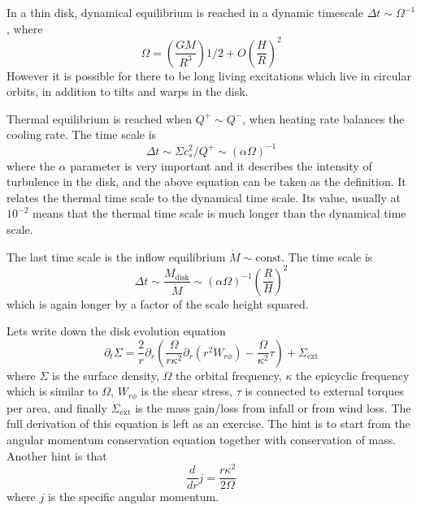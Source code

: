 \documentclass[letterpaper, 11pt]{article}
\numberwithin{equation}{section}
\numberwithin{figure}{section}
\begin{document}
In a thin disk, dynamical equilibrium is reached in a dynamic timescale $\Delta
t \sim \Omega^{-1}$, where
\begin{equation}
  \label{eq:5}
  \Omega = \left( \frac{GM}{R^3} \right)1/2 + O \left( \frac{H}{R} \right)^2
\end{equation}
However it is possible for there to be long living excitations which live in
circular orbits, in addition to tilts and warps in the disk.

Thermal equilibrium is reached when $Q^+ \sim Q^{-}$, when heating rate balances
the cooling rate. The time scale is
\begin{equation}
  \label{eq:6}
  \Delta t \sim \Sigma c_s^2 / Q^+ \sim (\alpha\Omega)^{-1}
\end{equation}
where the $\alpha$ parameter is very important and it describes the intensity of
turbulence in the disk, and the above equation can be taken as the definition.
It relates the thermal time scale to the dynamical time scale. Its value,
usually at $10^{-2}$ means that the thermal time scale is much longer than the
dynamical time scale.

The last time scale is the inflow equilibrium $\dot{M} \sim \mathrm{const}$. The
time scale is
\begin{equation}
  \label{eq:7}
  \Delta t \sim \frac{M_\mathrm{disk}}{\dot{M}} \sim (\alpha\Omega)^{-1}\left( \frac{R}{H} \right)^2
\end{equation}
which is again longer by a factor of the scale height squared.

Lets write down the disk evolution equation
\begin{equation}
  \label{eq:8}
  \partial_t\Sigma = \frac{2}{r}\partial_r \left( \frac{\Omega}{r\kappa^2}\partial_r(r^2W_{r\phi}) - \frac{\Omega}{\kappa^2}\tau \right) + \dot{\Sigma}_\mathrm{ext}
\end{equation}
where $\Sigma$ is the surface density, $\Omega$ the orbital frequency, $\kappa$
the epicyclic frequency which is similar to $\Omega$, $W_{r\phi}$ is the shear
stress, $\tau$ is connected to external torques per area, and finally
$\dot{\Sigma}_\mathrm{ext}$ is the mass gain/loss from infall or from wind loss.
The full derivation of this equation is left as an exercise. The hint is to
start from the angular momentum conservation equation together with conservation
of mass. Another hint is that
\begin{equation}
  \label{eq:9}
  \frac{d}{dr}j = \frac{r\kappa^2}{2\Omega}
\end{equation}
where $j$ is the specific angular momentum.
\end{document}
